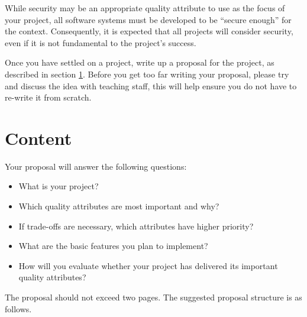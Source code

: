 \documentclass{csse4400}
\begin{document}
\noindent
While security may be an appropriate quality attribute to use as the focus of your project,
all software systems must be developed to be ``secure enough'' for the context.
Consequently, it is expected that all projects will consider security,
even if it is not fundamental to the project's success.

Once you have settled on a project, write up a proposal for the project, as described in section \ref{sect:content}.
Before you get too far writing your proposal,
please try and discuss the idea with teaching staff,
this will help ensure you do not have to re-write it from scratch.


\section{Content}\label{sect:content}
Your proposal will answer the following questions:
\begin{itemize}
    \item What is your project?
    \item Which quality attributes are most important and why?
    \item If trade-offs are necessary, which attributes have higher priority?
    \item What are the basic features you plan to implement?
    \item How will you evaluate whether your project has delivered its important quality attributes?
\end{itemize}

\noindent
The proposal should not exceed two pages.
The suggested proposal structure is as follows.
\end{document}
